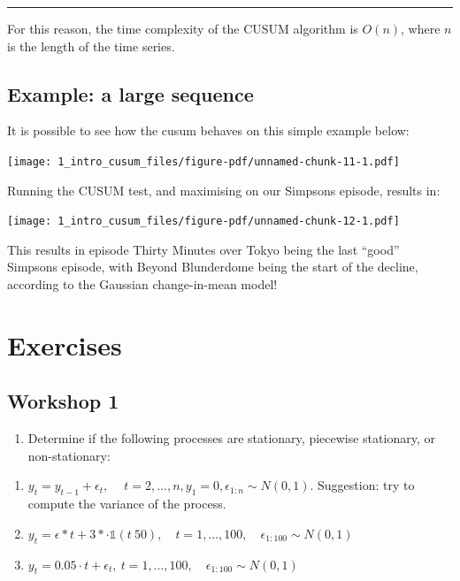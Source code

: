 \documentclass[
  letterpaper,
  DIV=11,
  numbers=noendperiod]{scrreprt}
\providecommand{\tightlist}{%
  \setlength{\itemsep}{0pt}\setlength{\parskip}{0pt}}\usepackage{longtable,booktabs,array}
\begin{document}
\begin{center}\rule{0.5\linewidth}{0.5pt}\end{center}

For this reason, the time complexity of the CUSUM algorithm is \(O(n)\),
where \(n\) is the length of the time series.

\subsection{Example: a large sequence}\label{example-a-large-sequence}

It is possible to see how the cusum behaves on this simple example
below:

\texttt{[image: 1\_intro\_cusum\_files/figure-pdf/unnamed-chunk-11-1.pdf]}

Running the CUSUM test, and maximising on our Simpsons episode, results
in:

\texttt{[image: 1\_intro\_cusum\_files/figure-pdf/unnamed-chunk-12-1.pdf]}

This results in episode Thirty Minutes over Tokyo being the last
``good'' Simpsons episode, with Beyond Blunderdome being the start of
the decline, according to the Gaussian change-in-mean model!

\section{Exercises}\label{exercises}

\subsection{Workshop 1}\label{workshop-1}

\begin{enumerate}
\def\labelenumi{\arabic{enumi}.}
\tightlist
\item
  Determine if the following processes are stationary, piecewise
  stationary, or non-stationary:
\end{enumerate}

\begin{enumerate}
\def\labelenumi{\alph{enumi}.}
\item
  \(y_t = y_{t - 1} + \epsilon_t, \quad \ t = 2, \dots, n, y_1 = 0, \epsilon_{1:n} \sim N(0, 1)\).
  Suggestion: try to compute the variance of the process.
\item
  \(y_t = \epsilon*t + 3* \cdot \mathbb{1}(t \> 50), \quad t = 1, \dots, 100, \quad \epsilon_{1:100} \sim N(0, 1)\)
\item
  \(y_t = 0.05 \cdot t + \epsilon_t, \ t = 1, \dots, 100, \quad \epsilon_{1:100} \sim N(0, 1)\)
\end{enumerate}
\end{document}
